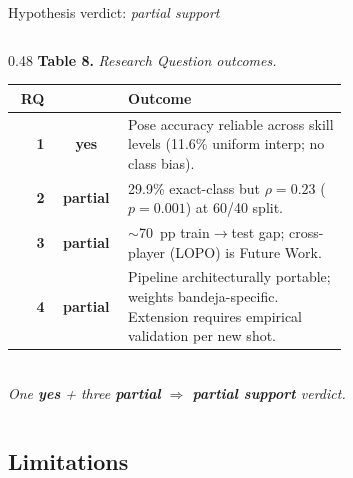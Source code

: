 \begin{frame}{Hypothesis verdict: \emph{partial support}}
\begin{columns}[T,onlytextwidth]
\begin{column}{0.48\textwidth}
\centering
\setlength{\tabcolsep}{2.5pt}
\renewcommand{\arraystretch}{1.20}
\scriptsize
\textbf{Table 8.} \itshape Research Question outcomes.\\[2pt]
\upshape
\begin{tabular}{@{}r c p{0.66\linewidth}@{}}
\toprule
\textbf{RQ} & & \textbf{Outcome} \\
\midrule
\textbf{1} & \textbf{\color{tecgreen}yes}     & Pose accuracy reliable across skill levels (11.6\% uniform interp; no class bias). \\
\textbf{2} & \textbf{\color{tecorange}partial} & 29.9\% exact-class but $\rho\!=\!0.23$ ($p\!=\!0.001$) at 60/40 split. \\
\textbf{3} & \textbf{\color{tecorange}partial} & $\sim$70~pp train$\to$test gap; cross-player (LOPO) is Future Work. \\
\textbf{4} & \textbf{\color{tecorange}partial} & Pipeline architecturally portable; weights bandeja-specific. Extension requires empirical validation per new shot. \\
\bottomrule
\end{tabular}\\[6pt]
{\tiny\itshape One \textbf{\color{tecgreen}yes} + three \textbf{\color{tecorange}partial} $\Rightarrow$ \textbf{partial support} verdict.}
\end{column}

\end{columns}
\end{frame}

\subsection{Limitations}

